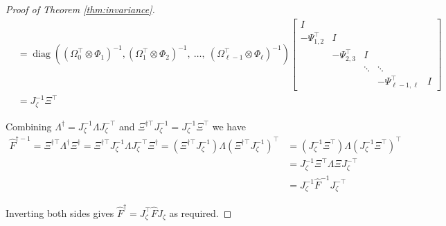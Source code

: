 \documentclass[12pt]{article}
\newcommand{\diag}{\operatorname{diag}}
\begin{document}
\begin{proof}[Proof of Theorem \ref{thm:invariance}]
\begin{align*}
& = \diag( (\Omega_0^\top \otimes \Phi_1)^{-1}, (\Omega_1^\top \otimes \Phi_2)^{-1}, \: \ldots, \: (\Omega_{\ell-1}^\top \otimes \Phi_\ell)^{-1} ) 
\begin{bmatrix}
I  &   &   &    \\
-\Psi^{\top}_{1,2}  &  I &   &  \\
 &  -\Psi^{\top}_{2,3} &  I &  \\
 &   &  \ddots  & \ddots  \\
&   &   &    -\Psi^{\top}_{\ell-1,\ell} &  I 
\end{bmatrix} \\
&= J_\zeta^{-1} \Xi^{\top}
\end{align*}

Combining $\Lambda^\dagger = J_\zeta^{-1} \Lambda J_\zeta^{-\top}$ and $\Xi^{\dagger\top} J_\zeta^{-1} = J_\zeta^{-1} \Xi^{\top}$ we have
\begin{align*}
\hat{F}^{\dagger-1} = \Xi^{\dagger\top} \Lambda^\dagger \Xi^\dagger = \Xi^{\dagger\top} J_\zeta^{-1} \Lambda J_\zeta^{-\top} \Xi^\dagger = (\Xi^{\dagger\top} J_\zeta^{-1}) \Lambda (\Xi^{\dagger\top} J_\zeta^{-1})^\top &= (J_\zeta^{-1} \Xi^{\top}) \Lambda (J_\zeta^{-1} \Xi^{\top})^\top \\
&= J_\zeta^{-1} \Xi^{\top} \Lambda \Xi J_\zeta^{-\top}\\
&= J_\zeta^{-1} \hat{F}^{-1} J_\zeta^{-\top}
\end{align*}

Inverting both sides gives $\hat{F}^\dagger = J_\zeta^\top \hat{F} J_\zeta$ as required. %

\end{proof}
\end{document}

